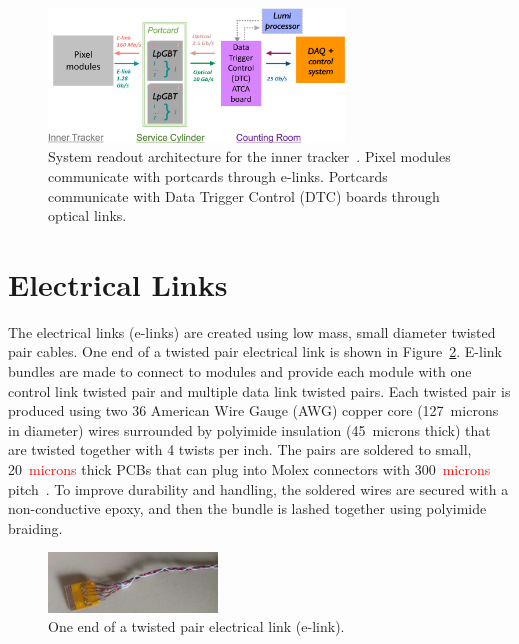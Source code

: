 \documentclass[a4paper,11pt]{article}
\newcommand{\fig}{Figure}
\newcommand{\red}{\textcolor{red}}
\begin{document}
\begin{figure}[htbp]
\centering
\includegraphics[width=0.70\textwidth,origin=c]{../figures/IT_System_Readout_2-crop.pdf}
\caption{
\label{fig:readout}
System readout architecture for the inner tracker~\cite{ref:orfanelli}. Pixel modules communicate with portcards through e-links. Portcards communicate with Data Trigger Control (DTC) boards through optical links.
}
\end{figure}

\section{Electrical Links}
\label{sec:electrical}


The electrical links (e-links) are created using low mass, small diameter twisted pair cables.
One end of a twisted pair electrical link is shown in \fig~\ref{fig:elink}.
E-link bundles are made to connect to modules and provide each module with one control link twisted pair and multiple data link twisted pairs.
Each twisted pair is produced using two 36 American Wire Gauge (AWG) copper core (127~microns in diameter) wires surrounded by polyimide insulation (45~microns thick) that are twisted together with 4 twists per inch.
The pairs are soldered to small, 20~\red{microns} thick PCBs that can plug into Molex connectors with 300~\red{microns} pitch~\cite{ref:molex45}.
To improve durability and handling, the soldered wires are secured with a non-conductive epoxy, and then the bundle is lashed together using polyimide braiding.

\begin{figure}[htbp]
\centering
\includegraphics[width=0.4\textwidth,origin=c]{../figures/e-link-1.jpg}
\caption{
\label{fig:elink}
One end of a twisted pair electrical link (e-link).
}
\end{figure}
\end{document}
